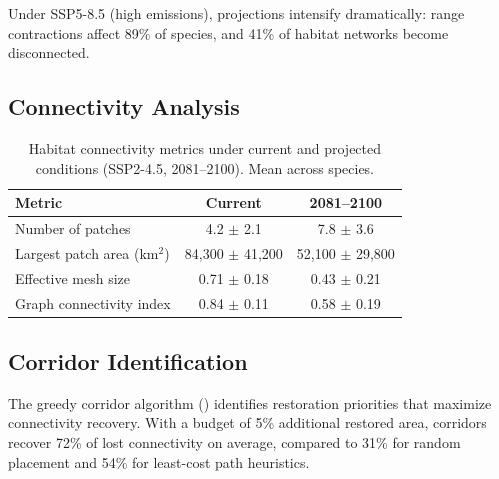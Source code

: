 Under SSP5-8.5 (high emissions), projections intensify dramatically:
range contractions affect 89\% of species, and 41\% of habitat networks
become disconnected.

\subsection{Connectivity Analysis}

\begin{table}[H]
\centering
\caption{Habitat connectivity metrics under current and projected
conditions (SSP2-4.5, 2081--2100). Mean across species.}
\label{tab:connectivity}
\begin{tabular}{lcc}
\toprule
\textbf{Metric} & \textbf{Current} & \textbf{2081--2100} \\
\midrule
Number of patches         & 4.2 $\pm$ 2.1  & 7.8 $\pm$ 3.6 \\
Largest patch area (km$^2$) & 84{,}300 $\pm$ 41{,}200 & 52{,}100 $\pm$ 29{,}800 \\
Effective mesh size       & 0.71 $\pm$ 0.18 & 0.43 $\pm$ 0.21 \\
Graph connectivity index  & 0.84 $\pm$ 0.11 & 0.58 $\pm$ 0.19 \\
\bottomrule
\end{tabular}
\end{table}

\subsection{Corridor Identification}

The greedy corridor algorithm () identifies
restoration priorities that maximize connectivity recovery. With a
budget of 5\% additional restored area, corridors recover 72\% of lost
connectivity on average, compared to 31\% for random placement and 54\%
for least-cost path heuristics.


